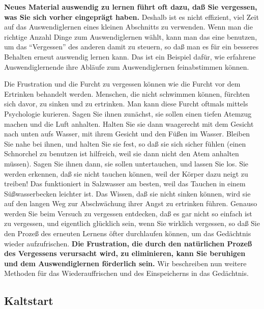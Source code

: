 \textbf{Neues Material auswendig zu lernen führt oft dazu, daß Sie vergessen, was Sie sich vorher eingeprägt haben.}
Deshalb ist es nicht effizient, viel Zeit auf das Auswendiglernen eines kleinen Abschnitts zu verwenden.
Wenn man die richtige Anzahl Dinge zum Auswendiglernen wählt, kann man das eine benutzen, um das \enquote{Vergessen} des anderen damit zu steuern, so daß man es für ein besseres Behalten erneut auswendig lernen kann.
Das ist ein Beispiel dafür, wie erfahrene Auswendiglernende ihre Abläufe zum Auswendiglernen feinabstimmen können.

Die Frustration und die Furcht zu vergessen können wie die Furcht vor dem Ertrinken behandelt werden.
Menschen, die nicht schwimmen können, fürchten sich davor, zu sinken und zu ertrinken.
Man kann diese Furcht oftmals mittels Psychologie kurieren.
Sagen Sie ihnen zunächst, sie sollen einen tiefen Atemzug machen und die Luft anhalten.
Halten Sie sie dann waagerecht mit dem Gesicht nach unten aufs Wasser, mit ihrem Gesicht und den Füßen im Wasser.
Bleiben Sie nahe bei ihnen, und halten Sie sie fest, so daß sie sich sicher fühlen (einen Schnorchel zu benutzen ist hilfreich, weil sie dann nicht den Atem anhalten müssen).
Sagen Sie ihnen dann, sie sollen untertauchen, und lassen Sie los. Sie werden erkennen, daß sie nicht tauchen können, weil der Körper dazu neigt zu treiben!
Das funktioniert in Salzwasser am besten, weil das Tauchen in einem Süßwasserbecken leichter ist.
Das Wissen, daß sie nicht sinken können, wird sie auf den langen Weg zur Abschwächung ihrer Angst zu ertrinken führen.
Genauso werden Sie beim Versuch zu vergessen entdecken, daß es gar nicht so einfach ist zu vergessen, und eigentlich glücklich sein, wenn Sie wirklich vergessen, so daß Sie den Prozeß des erneuten Lernens öfter durchlaufen können, um das Gedächtnis wieder aufzufrischen.
\textbf{Die Frustration, die durch den natürlichen Prozeß des Vergessens verursacht wird, zu eliminieren, kann Sie beruhigen und dem Auswendiglernen förderlich sein.}
Wir beschreiben nun weitere Methoden für das Wiederauffrischen und des Einspeicherns in das Gedächtnis.
 

\subsection{Kaltstart}\hypertarget{c1iii6g}{}


